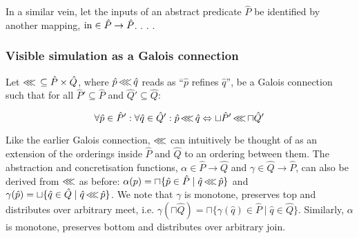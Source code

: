 In a similar vein, let the inputs of an abstract predicate $\hat P$ be identified by another mapping, $\operatorname{in} \in \hat P \rightarrow \hat P$. . . .




\subsubsection{Visible simulation as a Galois connection} Let $\operatorname{\lll} \, \subseteq \hat P \times \hat Q$, where $\hat p \operatorname{\lll} \hat q$ reads as ``$\hat p$ refines $\hat q$'', be a Galois connection such that for all $\hat P' \subseteq \hat P$ and $\hat Q' \subseteq \hat Q$:

\begin{equation*}
\forall \hat p \in \hat P' : \forall \hat q \in \hat Q' : \hat p \operatorname{\lll} \hat q \Leftrightarrow \sqcup \hat P' \operatorname{\lll} \sqcap \hat Q'
\end{equation*}

\noindent Like the earlier Galois connection, $\operatorname{\lll}$ can intuitively be thought of as an extension of the orderings inside $\hat P$ and $\hat Q$ to an ordering between them. The abstraction and concretisation functions, $\alpha \in \hat P \rightarrow \hat Q$ and $\gamma \in \hat Q \rightarrow \hat P$, can also be derived from $\operatorname{\lll}$ as before: $\alpha(p) = \sqcap \{ \hat p \in \hat P \mid \hat q \operatorname{\lll} \hat p \}$ and $\gamma(\hat p) = \sqcup \{ \hat q \in \hat Q \mid \hat q \operatorname{\lll} \hat p \}$. We note that $\gamma$ is monotone, preserves top and distributes over arbitrary meet, i.e. $\gamma(\sqcap \hat Q) = \sqcap \{ \gamma(\hat q) \in \hat P \mid \hat q \in \hat Q\}$. Similarly, $\alpha$ is monotone, preserves bottom and distributes over arbitrary join.


